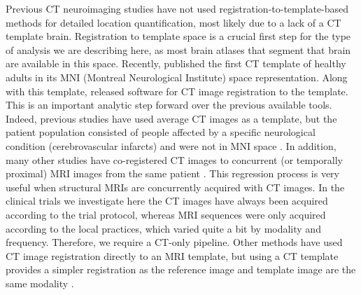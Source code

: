 \documentclass[10pt]{article}\usepackage[]{graphicx}\usepackage[]{color}
\begin{document}


Previous CT neuroimaging studies have not used registration-to-template-based methods for detailed location quantification, most likely due to a lack of a CT template brain.  Registration to template space is a crucial first step for the type of analysis we are describing here, as most brain atlases that segment that brain are available in this space.  Recently, \citet{rorden_age-specific_2012} published the first CT template of healthy adults in its MNI (Montreal Neurological Institute) space representation.  Along with this template, \citet{rorden_age-specific_2012} released software for CT image registration to the template.  This is an important analytic step forward over the previous available tools. Indeed, previous studies have used average CT images as a template, but the patient population consisted of people affected by a specific neurological condition (cerebrovascular infarcts) and were not in MNI space \citep{jongen_construction_2004}.  In addition, many other studies have co-registered CT images to concurrent (or temporally proximal) MRI images from the same patient \citep{fitzpatrick_visual_1998, das_affine-based_2011, bhattacharya_registration_2000, pelizzari_accurate_1989}.  This regression process is very useful when structural MRIs are concurrently acquired with CT images.  In the clinical trials we investigate here the CT images have always been acquired according to the trial protocol, whereas MRI sequences were only acquired according to the local practices, which varied quite a bit by modality and frequency.  Therefore, we require a CT-only pipeline. 
Other methods have used CT image registration directly to an MRI template, but using a CT template provides a simpler registration as the reference image and template image are the same modality \citep{solomon_user-friendly_2007, li_registration_2010, princich_rapid_2013}.
\end{document}
